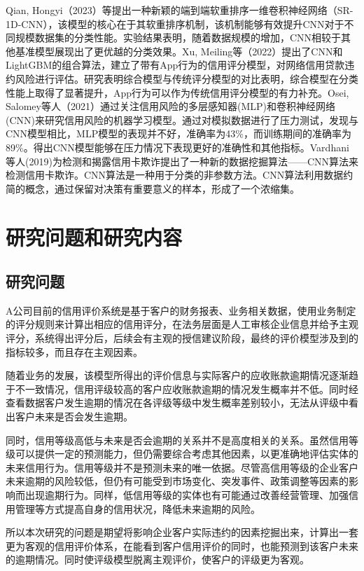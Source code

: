 Qian, Hongyi（2023）等提出一种新颖的端到端软重排序一维卷积神经网络（SR-1D-CNN），该模型的核心在于其软重排序机制，该机制能够有效提升CNN对于不同规模数据集的分类性能。实验结果表明，随着数据规模的增加，CNN相较于其他基准模型展现出了更优越的分类效果。Xu, Meiling等（2022）提出了CNN和LightGBM的组合算法，建立了带有App行为的信用评分模型，对网络信用贷款违约风险进行评估。研究表明综合模型与传统评分模型的对比表明，综合模型在分类性能上取得了显著提升，App行为可以作为传统信用评分模型的有力补充。Osei, Salomey等人（2021）通过关注信用风险的多层感知器(MLP)和卷积神经网络(CNN)来研究信用风险的机器学习模型。通过对模拟数据进行了压力测试，发现与CNN模型相比，MLP模型的表现并不好，准确率为43\%，而训练期间的准确率为89\%。得出CNN模型能够在压力情况下表现更好的准确性和其他指标。Vardhani等人(2019)为检测和揭露信用卡欺诈提出了一种新的数据挖掘算法——CNN算法来检测信用卡欺诈。CNN算法是一种用于分类的非参数方法。CNN算法利用数据约简的概念，通过保留对决策有重要意义的样本，形成了一个浓缩集。

\section{研究问题和研究内容}
\subsection{研究问题}
A公司目前的信用评价系统是基于客户的财务报表、业务相关数据，使用业务制定的评分规则来计算出相应的信用评分，在法务层面是人工审核企业信息并给予主观评分，系统得出评分后，后续会有主观的授信建议阶段，最终的评价模型涉及到的指标较多，而且存在主观因素。

随着业务的发展，该模型所得出的评价信息与实际客户的应收账款逾期情况逐渐趋于不一致情况，信用评级较高的客户应收账款逾期的情况发生概率并不低。同时经查看数据客户发生逾期的情况在各评级等级中发生概率差别较小，无法从评级中看出客户未来是否会发生逾期。

同时，信用等级高低与未来是否会逾期的关系并不是高度相关的关系。虽然信用等级可以提供一定的预测能力，但仍需要综合考虑其他因素，以更准确地评估实体的未来信用行为。信用等级并不是预测未来的唯一依据。尽管高信用等级的企业客户未来逾期的风险较低，但仍有可能受到市场变化、突发事件、政策调整等因素的影响而出现逾期行为。同样，低信用等级的实体也有可能通过改善经营管理、加强信用管理等方式提高自身的信用状况，降低未来逾期的风险。

所以本次研究的问题是期望将影响企业客户实际违约的因素挖掘出来，计算出一套更为客观的信用评价体系，在能看到客户信用评价的同时，也能预测到该客户未来的逾期情况。同时使评级模型脱离主观评价，使客户的评级更为客观。
